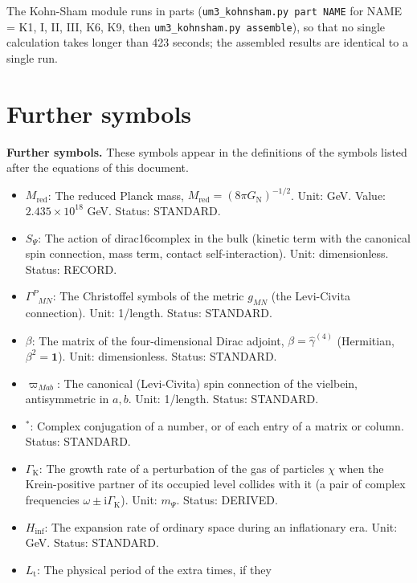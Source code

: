 \documentclass[
  10pt,
]{article}
\providecommand{\tightlist}{%
  \setlength{\itemsep}{0pt}\setlength{\parskip}{0pt}}
\begin{document}
The Kohn-Sham module runs in parts
(\texttt{um3\_kohnsham.py\ part\ NAME} for NAME = K1, I, II, III, K6,
K9, then \texttt{um3\_kohnsham.py\ assemble}), so that no single
calculation takes longer than 423 seconds; the assembled results are
identical to a single run.

\hypertarget{further-symbols}{%
\section{Further symbols}\label{further-symbols}}

\textbf{Further symbols.} These symbols appear in the definitions of the
symbols listed after the equations of this document.

\begin{itemize}
\tightlist
\item
  \(M_{\mathrm{red}}\): The reduced Planck mass,
  \(M_{\mathrm{red}} = (8\pi G_{\mathrm{N}})^{-1/2}\). Unit: GeV. Value:
  \(2.435\times10^{18}\) GeV. Status: STANDARD.
\item
  \(S_\Psi\): The action of dirac16complex in the bulk (kinetic term
  with the canonical spin connection, mass term, contact
  self-interaction). Unit: dimensionless. Status: RECORD.
\item
  \(\Gamma^P{}_{MN}\): The Christoffel symbols of the metric \(g_{MN}\)
  (the Levi-Civita connection). Unit: 1/length. Status: STANDARD.
\item
  \(\beta\): The matrix of the four-dimensional Dirac adjoint,
  \(\beta = \hat\gamma^{(4)}\) (Hermitian, \(\beta^2 = \mathbf{1}\)).
  Unit: dimensionless. Status: STANDARD.
\item
  \(\varpi_{Mab}\): The canonical (Levi-Civita) spin connection of the
  vielbein, antisymmetric in \(a, b\). Unit: 1/length. Status: STANDARD.
\item
  \({}^*\): Complex conjugation of a number, or of each entry of a
  matrix or column. Status: STANDARD.
\item
  \(\Gamma_{\mathrm{K}}\): The growth rate of a perturbation of the gas
  of particles \(\chi\) when the Krein-positive partner of its occupied
  level collides with it (a pair of complex frequencies
  \(\omega \pm \mathrm{i}\Gamma_{\mathrm{K}}\)). Unit: \(m_\Psi\).
  Status: DERIVED.
\item
  \(H_{\mathrm{inf}}\): The expansion rate of ordinary space during an
  inflationary era. Unit: GeV. Status: STANDARD.
\item
  \(L_{\mathrm{t}}\): The physical period of the extra times, if they

\end{itemize}
\end{document}
